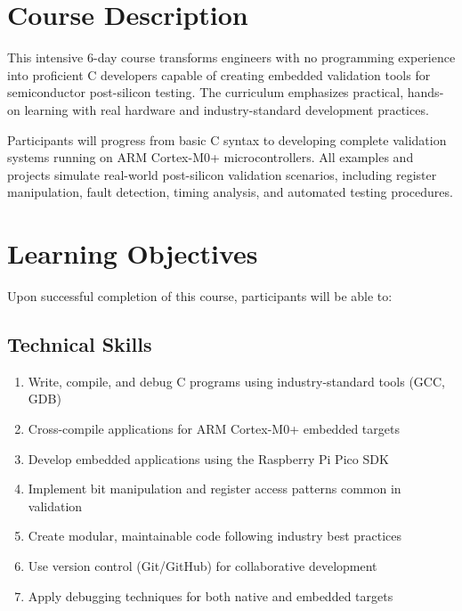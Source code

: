 \documentclass[11pt,a4paper]{article}
\begin{document}
\section{Course Description}

This intensive 6-day course transforms engineers with no programming experience into proficient C developers capable of creating embedded validation tools for semiconductor post-silicon testing. The curriculum emphasizes practical, hands-on learning with real hardware and industry-standard development practices.

Participants will progress from basic C syntax to developing complete validation systems running on ARM Cortex-M0+ microcontrollers. All examples and projects simulate real-world post-silicon validation scenarios, including register manipulation, fault detection, timing analysis, and automated testing procedures.

\section{Learning Objectives}

Upon successful completion of this course, participants will be able to:

\subsection{Technical Skills}
\begin{enumerate}
    \item Write, compile, and debug C programs using industry-standard tools (GCC, GDB)
    \item Cross-compile applications for ARM Cortex-M0+ embedded targets
    \item Develop embedded applications using the Raspberry Pi Pico SDK
    \item Implement bit manipulation and register access patterns common in validation
    \item Create modular, maintainable code following industry best practices
    \item Use version control (Git/GitHub) for collaborative development
    \item Apply debugging techniques for both native and embedded targets
\end{enumerate}
\end{document}
